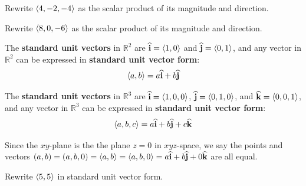 \documentclass[letterpaper, twoside, 12pt]{book}
\begin{document}
          \begin{solution}

          \end{solution}

          \begin{problem}
            Rewrite $\langle4,-2,-4\rangle$ as the scalar product of its magnitude and
            direction.
          \end{problem}

          \begin{solution}

          \end{solution}

          \begin{problem}
            Rewrite $\langle8,0,-6\rangle$ as the scalar product of its magnitude and
            direction.
          \end{problem}

          \begin{solution}

          \end{solution}



\begin{definition}
The \textbf{standard unit vectors} in $\mathbb{R}^2$ are
$\mathbf{\widehat{i}}=\langle1,0\rangle$ and $\mathbf{\widehat{j}}=\langle0,1\rangle$, and any vector in $\mathbb{R}^2$
can be expressed in \textbf{standard unit vector form}:
  \[\langle a,b\rangle=a\mathbf{\widehat{i}}+b\mathbf{\widehat{j}}\]

The \textbf{standard unit vectors} in $\mathbb{R}^3$ are
$\mathbf{\widehat{i}}=\langle1,0,0\rangle$, $\mathbf{\widehat{j}}=\langle0,1,0\rangle$, and $\mathbf{\widehat{k}}=\langle0,0,1\rangle$, and any vector in
$\mathbb{R}^3$ can be expressed in \textbf{standard unit vector form}:
  \[\langle a,b,c\rangle=a\mathbf{\widehat{i}}+b\mathbf{\widehat{j}}+c\mathbf{\widehat{k}}\]
\end{definition}

\begin{remark}
  Since the $xy$-plane is the the plane $z=0$ in $xyz$-space, we say the
  points and vectors $(a,b)=(a,b,0)=\langle a,b\rangle=\langle a,b,0\rangle=a\mathbf{\widehat{i}}+b\mathbf{\widehat{j}}+0\mathbf{\widehat{k}}$
  are all equal.
\end{remark}



          \begin{problem}
            Rewrite $\langle5,5\rangle$ in standard unit vector form.
          \end{problem}

          \begin{solution}

          \end{solution}
\end{document}
